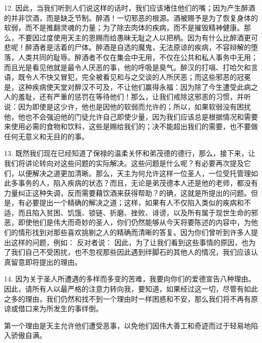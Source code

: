 12. 因此，当我们听到人们说这样的话时，我们应该堵住他们的嘴；因为产生醉酒的并非饮酒，而是缺乏节制。醉酒！一切邪恶的根源。酒被赐予是为了恢复身体的软弱，而不是推翻灵魂的力量；为了除去肉体的疾病，而不是摧毁精神健康。那么，不要因过度使用天主的恩赐而给愚昧无耻之人以把柄。因为有什么比醉酒更可悲呢！醉酒者是活着的尸体。醉酒是自选的魔鬼，无法原谅的疾病，不容辩解的堕落，人类共同的耻辱。醉酒者不仅在集会中无用，不仅在公共和私人事务中无用；而且光是看见他就是最令人厌恶的事，他的呼吸是臭气。醉汉的打嗝、打哈欠和言语，既令人不快又冒犯，完全被看见和与之交谈的人所厌恶；而这些邪恶的冠冕是，这种疾病使天堂对醉汉不可及，不让他们赢得永福：因为除了今生遭受此病之人的羞耻，还有严重的惩罚在等待他们！那么，让我们戒除这邪恶的习惯，并听说：因为即使是这少许，他也是因他的软弱而允许的；所以，如果软弱没有困扰他，他也不会强迫他的门徒允许自己即使少量，因为我们应该总是根据情况和需要来使用必需的食物和饮料，这些是赐给我们的；决不能超出我们的需要，也不要做任何无意义和无目的的事。\par

13. 既然我们现在已经知道了保禄的温柔关怀和弟茂德的德行，那么，接下来，让我们将讲论转向对这些问题的实际解决。这些问题是什么呢？有必要再次提及它们，以便解决之道更加清晰。那么，天主为何允许这样一位圣人，一位受托管理如此多事务的人，陷入疾病的状态？而且，无论是弟茂德本人还是他的老师，都没有力量纠正这种失调，反而需要藉饮酒来获得帮助？的确，这就是所提出的问题。但是，有必要提出一个精确的解决之道；这样，如果有人不仅陷入类似的疾病和不适，而且陷入贫困、饥饿、锁链、折磨、挫败、诽谤，以及所有属于现世生命的邪恶，即使他们是伟大而奇妙的圣人，你们仍然能够从今天将要陈述的内容中，为他们的情形找到对那些喜欢挑剔之人的精确而清晰的答复。因为你们曾听到许多人提出这样的问题，例如：  反对者说： 因此，为了让我们看到这些事情的原因，也为了我们自己不受困扰，也不忽视那些因此遇到绊脚石的其他人的情况，我们应该认真留意即将提出的理由。\par

14. 因为关于圣人所遭遇的多样而多变的苦难，我要向你们的爱德宣告八种理由。因此，请所有人以最严格的注意力转向我，要知道，如果经过这一切，尽管有如此之多的理由，我们仍然和找不到一个理由时一样困惑和不安，那么我们将不再有原谅或借口来为所发生的事绊倒。\par

第一个理由是天主允许他们遭受恶事，以免他们因伟大善工和奇迹而过于轻易地陷入骄傲自满。\par

